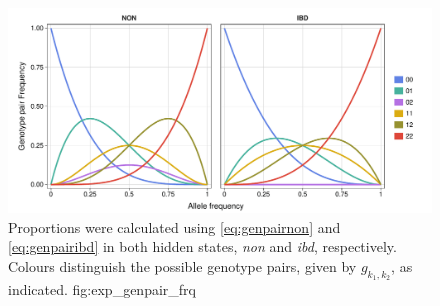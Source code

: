 

\begin{figure}[!htb]
\includegraphics[width=\textwidth]{./img/ch4/exp-genpair-frq}
%
{Proportions were calculated using \cref{eq:genpairnon} and \cref{eq:genpairibd} in both hidden states, \emph{non} and \emph{ibd}, respectively.
Colours distinguish the  possible genotype pairs, given by $g_{k_1,k_2}$, as indicated.}%
{fig:exp_genpair_frq}
\end{figure}
